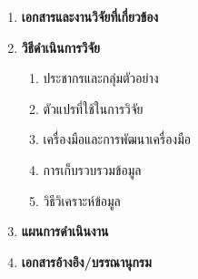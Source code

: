 \begin{titlepage}
\begin{enumerate}
    \lipsum[1-1]

    \item\textbf{เอกสารและงานวิจัยที่เกี่ยวข้อง}
    
    \lipsum[1-1]

    \item\textbf{วิธีดำเนินการวิจัย}
    
    \begin{enumerate}

      \item ประชากรและกลุ่มตัวอย่าง
      
      \lipsum[1-1]

      \item ตัวแปรที่ใช้ในการวิจัย
      
      \lipsum[1-1]

      \item เครื่องมือและการพัฒนาเครื่องมือ
      
      \lipsum[1-1]

      \item การเก็บรวบรวมข้อมูล
      
      \lipsum[1-1]

      \item วิธีวิเคราะห์ข้อมูล  
      
      \lipsum[1-1]

    \end{enumerate}
    \item\textbf{แผนการดำเนินงาน}
    
    \lipsum[1-3]

    \item\textbf{เอกสารอ้างอิง/บรรณานุกรม}
    
    \lipsum[1-4]

  \end{enumerate}


           


           
           
           
           
\end{titlepage}